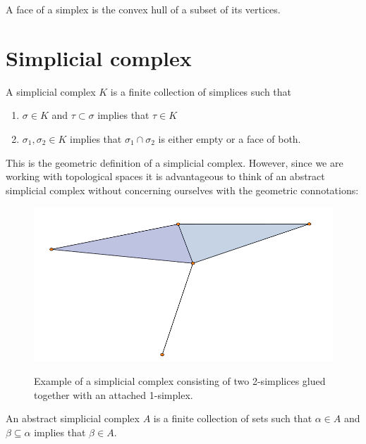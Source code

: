 \begin{definition}
A face of a simplex is the convex hull of a subset of its vertices.
\end{definition}
\section{Simplicial complex}

\begin{definition}
A simplicial complex $K$ is a finite collection of simplices such that

\begin{enumerate}
    \item $\sigma \in K$ and $\tau \subset \sigma$ implies that $\tau \in K$
    \item $\sigma_{1}, \sigma_{2} \in K$ implies that $\sigma_{1} \cap \sigma_{2}$ is either empty or a face of both.
\end{enumerate}

\end{definition}
This is the geometric definition of a simplicial complex. However, since we are working with topological spaces it is advantageous to think of an abstract simplicial complex without concerning ourselves with the geometric connotations:

\begin{figure}
  \centering
  \includegraphics[scale=0.7]{complex.pdf}
  \label{complex}
  \caption{Example of a simplicial complex consisting of two 2-simplices glued together with an attached 1-simplex.}
\end{figure}

\begin{definition}[book]
An abstract simplicial complex $A$ is a finite collection of sets such that $\alpha \in A$ and $\beta \subseteq \alpha$ implies that $\beta \in A$.
\end{definition}

